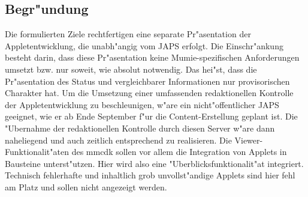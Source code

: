 \documentclass{article}
\begin{document}
\subsection*{Begr"undung}
Die formulierten Ziele rechtfertigen eine separate Pr"asentation der Appletentwicklung, die
unabh"angig vom JAPS erfolgt. Die Einschr"ankung besteht darin, dass diese Pr"asentation
keine Mumie-spezifischen Anforderungen umsetzt bzw. nur soweit, wie absolut notwendig. Das
hei"st, dass die Pr"asentation des Status und vergleichbarer Informationen nur
provisorischen Charakter hat.
Um die Umsetzung einer umfassenden redaktionellen Kontrolle der Appletentwicklung zu
beschleunigen, w"are ein nicht"offentlicher JAPS geeignet, wie er ab Ende September f"ur die
Content-Erstellung geplant ist. Die "Ubernahme der redaktionellen Kontrolle durch diesen
Server w"are dann naheliegend und auch zeitlich entsprechend zu realisieren.
Die Viewer-Funktionalit"aten des mmcdk sollen vor allem die Integration von Applets in
Bausteine unterst"utzen. Hier wird also eine "Uberblicksfunktionalit"at
integriert. Technisch fehlerhafte und inhaltlich grob unvollst"andige Applets sind hier fehl
am Platz und sollen nicht angezeigt werden.
\end{document}
